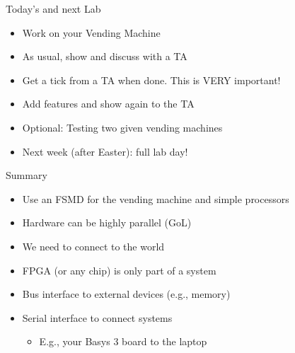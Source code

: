 \begin{frame}[fragile]{Today's  and next Lab}
\begin{itemize}
\item Work on your Vending Machine
\item As usual, show and discuss with a TA
\item Get a tick from a TA when done. This is VERY important!
\item Add features and show again to the TA
\item Optional: Testing two given vending machines
\item Next week (after Easter): full lab day!
\end{itemize}
\end{frame}



\begin{frame}[fragile]{Summary}
\begin{itemize}
\item Use an FSMD for the vending machine and simple processors
\item Hardware can be highly parallel (GoL)
\item We need to connect to the world
\item FPGA (or any chip) is only part of a system
\item Bus interface to external devices (e.g., memory)
\item Serial interface to connect systems
\begin{itemize}
\item E.g., your Basys 3 board to the laptop
\end{itemize}
\end{itemize}
\end{frame}





